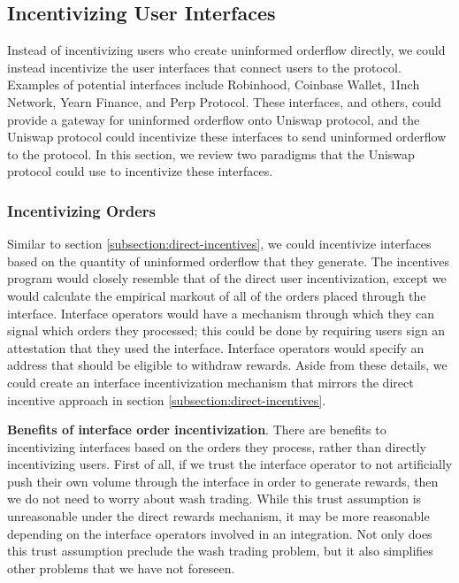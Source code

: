 \subsection{Incentivizing User Interfaces} \label{subsection:interface-incentives}
    Instead of incentivizing users who create uninformed orderflow directly, we could instead incentivize the user interfaces that connect users to the protocol. Examples of potential interfaces include Robinhood, Coinbase Wallet, 1Inch Network, Yearn Finance, and Perp Protocol. These interfaces, and others, could provide a gateway for uninformed orderflow onto Uniswap protocol, and the Uniswap protocol could incentivize these interfaces to send uninformed orderflow to the protocol. In this section, we review two paradigms that the Uniswap protocol could use to incentivize these interfaces.

    \subsubsection{Incentivizing Orders}
        Similar to section \ref{subsection:direct-incentives}, we could incentivize interfaces based on the quantity of uninformed orderflow that they generate. The incentives program would closely resemble that of the direct user incentivization, except we would calculate the empirical markout of all of the orders placed through the interface. Interface operators would have a mechanism through which they can signal which orders they processed; this could be done by requiring users sign an attestation that they used the interface. Interface operators would specify an address that should be eligible to withdraw rewards. Aside from these details, we could create an interface incentivization mechanism that mirrors the direct incentive approach in section \ref{subsection:direct-incentives}.

        \textbf{Benefits of interface order incentivization}.
        There are benefits to incentivizing interfaces based on the orders they process, rather than directly incentivizing users. First of all, if we trust the interface operator to not artificially push their own volume through the interface in order to generate rewards, then we do not need to worry about wash trading. While this trust assumption is unreasonable under the direct rewards mechanism, it may be more reasonable depending on the interface operators involved in an integration. Not only does this trust assumption preclude the wash trading problem, but it also simplifies other problems that we have not foreseen.

